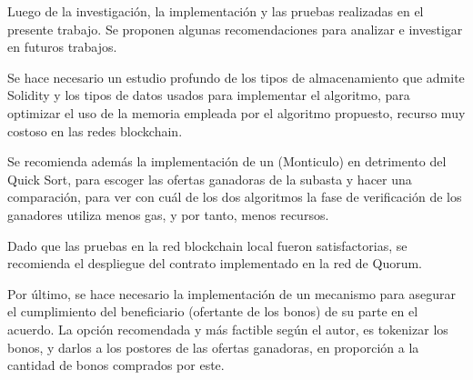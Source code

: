 \begin{recomendations}
    Luego de la investigación, la implementación y las pruebas realizadas en el presente trabajo. Se 
    proponen algunas recomendaciones para analizar e investigar en futuros trabajos.

    Se hace necesario un estudio profundo de los tipos de almacenamiento que admite Solidity y los tipos de
    datos usados para implementar el algoritmo, para optimizar el uso de la memoria empleada por el algoritmo
    propuesto, recurso muy costoso en las redes blockchain.

    Se recomienda además la implementación de un  (Monticulo) en detrimento del Quick Sort,
    para escoger las ofertas ganadoras de la subasta y hacer una comparación, para ver con cuál de los
    dos algoritmos la fase de verificación de los ganadores utiliza menos gas, y por tanto, menos recursos.

    Dado que las pruebas en la red blockchain local fueron satisfactorias, se recomienda el despliegue del
    contrato implementado en la red de Quorum.

    Por último, se hace necesario la implementación de un mecanismo para asegurar el cumplimiento del
    beneficiario (ofertante de los bonos) de su parte en el acuerdo. La opción recomendada y más 
    factible según el autor, es tokenizar los bonos, y darlos a los postores de las ofertas ganadoras,
    en proporción a la cantidad de bonos comprados por este.

\end{recomendations}
